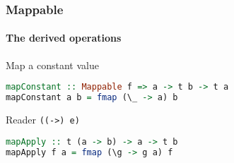 \begin{frame}[fragile]
\frametitle{Mappable}
\framesubtitle{The derived operations}
\begin{block}{Map a constant value}
\begin{lstlisting}[style=language,language=haskell]
mapConstant :: Mappable f => a -> t b -> t a
mapConstant a b = fmap (\_ -> a) b
\end{lstlisting}
\end{block}
\begin{block}{Reader \lstinline{((->) e)}}
\begin{lstlisting}[style=language,language=haskell]
mapApply :: t (a -> b) -> a -> t b
mapApply f a = fmap (\g -> g a) f

\end{lstlisting}
\end{block}
\end{frame}

